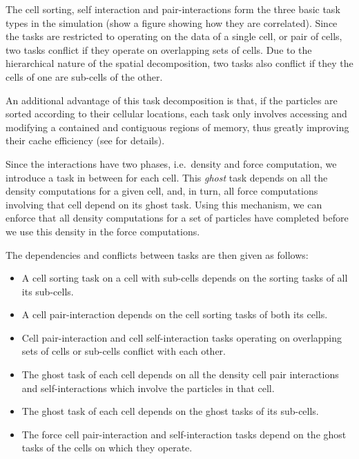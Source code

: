 \documentclass[final]{siamltex}
\begin{document}
The cell sorting, self interaction and pair-interactions form
the three basic task types in the simulation (show a figure
showing how they are correlated).
Since the tasks are restricted to operating on the data of a
single cell, or pair of cells, two tasks conflict if they
operate on overlapping sets of cells.
Due to the hierarchical nature of the spatial decomposition,
two tasks also conflict if they the cells of one are sub-cells
of the other.

An additional advantage of this task decomposition is that, if
the particles are sorted according to their cellular locations,
each task only involves accessing and modifying a contained
and contiguous regions of memory, thus greatly improving their
cache efficiency (see \cite{ref:Gonnet2012} for details).

Since the interactions have two phases, i.e.~density and force
computation, we introduce a task in between for each cell.
This {\em ghost} task depends on all the density computations
for a given cell, and, in turn, all force computations involving
that cell depend on its ghost task.
Using this mechanism, we can enforce that all density computations
for a set of particles have completed before we use this
density in the force computations.

The dependencies and conflicts between tasks are then given as follows:

\begin{itemize}

    \item A cell sorting task on a cell with sub-cells depends
        on the sorting tasks of all its sub-cells.

    \item A cell pair-interaction depends on the cell sorting
        tasks of both its cells.
        
    \item Cell pair-interaction and cell self-interaction tasks
        operating on overlapping sets of cells or sub-cells
        conflict with each other.
        
    \item The ghost task of each cell depends on all the density cell pair
        interactions and self-interactions which involve the particles
        in that cell.
        
    \item The ghost task of each cell depends on the ghost tasks of
        its sub-cells.
        
    \item The force cell pair-interaction and self-interaction tasks
        depend on the ghost tasks of the cells on which they operate.

\end{itemize}
\end{document}
